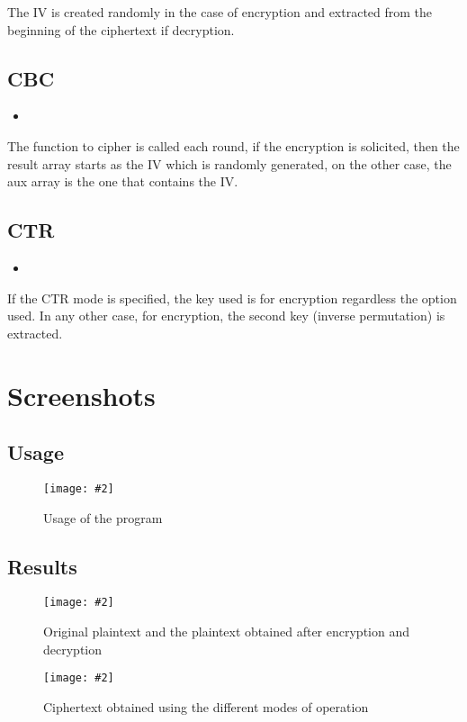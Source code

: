\documentclass[titlepage, 12pt]{article}
\numberwithin{equation}{section}%
\numberwithin{figure}{section}%
\numberwithin{table}{section}%
\newcommand{\imagen}[4][]{
	\begin{figure}[H]
		\centering
		\texttt{[image: \#2]}
		\caption{#3}
		#4
	\end{figure}
}
\newcommand{\delimitCodeScript}[6][]{
	\begin{itemize}
		\item[]
	\end{itemize}	
}
\begin{document}
		The IV is created randomly in the case of encryption and extracted from the beginning of the ciphertext if decryption.
		\subsection{CBC}
		\delimitCodeScript{cpp}{Functions}{CBC operation mode}{93}{106}
		The function to cipher is called each round, if the encryption is solicited, then the result array starts as the IV which is randomly generated, on the other case, the aux array is the one that contains the IV.
		\subsection{CTR}
		\delimitCodeScript{cpp}{Functions}{CTR operation mode}{108}{113}
		If the CTR mode is specified, the key used is for encryption regardless the option used. In any other case, for encryption, the second key (inverse permutation) is extracted.
	\section{Screenshots}
	\subsection{Usage}
		\imagen[width=\linewidth]{Picture1}{Usage of the program}{\label{Usage}}
	\subsection{Results}
		\imagen[width=\linewidth]{Picture2}{Original plaintext and the plaintext obtained after encryption and decryption}{\label{Plaintext}}
		\imagen[width=\linewidth]{Picture3}{Ciphertext obtained using the different modes of operation}{\label{Ciphertext}}
	
	
\end{document}

